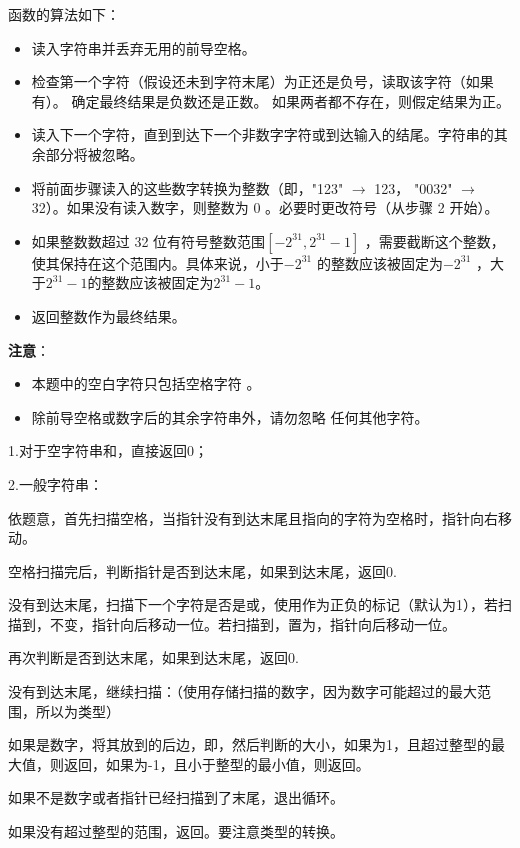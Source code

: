 \documentclass[a4paper]{report}
\begin{document}
函数的算法如下：
\begin{itemize}
\itemsep=0pt \parskip=0pt%
  \item 读入字符串并丢弃无用的前导空格。
  \item 检查第一个字符（假设还未到字符末尾）为正还是负号，读取该字符（如果有）。 确定最终结果是负数还是正数。 如果两者都不存在，则假定结果为正。
  \item 读入下一个字符，直到到达下一个非数字字符或到达输入的结尾。字符串的其余部分将被忽略。
  \item 将前面步骤读入的这些数字转换为整数（即，"123" $\rightarrow$ 123， "0032" $\rightarrow$32）。如果没有读入数字，则整数为 0 。必要时更改符号（从步骤 2 开始）。
  \item 如果整数数超过 32 位有符号整数范围$[−2^{31},  2^{31} − 1]$ ，需要截断这个整数，使其保持在这个范围内。具体来说，小于$−2^{31}$ 的整数应该被固定为$−2^{31}$ ，大于$2^{31} − 1$的整数应该被固定为$2^{31} − 1$。
\item 返回整数作为最终结果。
\end{itemize}

\textbf{注意}：
\begin{itemize}
\itemsep=0pt \parskip=0pt
\item 本题中的空白字符只包括空格字符 。
\item 除前导空格或数字后的其余字符串外，请勿忽略 任何其他字符。
\end{itemize}

\begin{tips}
1.对于空字符串和，直接返回0；

2.一般字符串：

依题意，首先扫描空格，当指针没有到达末尾且指向的字符为空格时，指针向右移动。

空格扫描完后，判断指针是否到达末尾，如果到达末尾，返回0.

没有到达末尾，扫描下一个字符是否是\dm{+}或\dm{-}，使用作为正负的标记（默认为1），若扫描到\dm{+}，不变，指针向后移动一位。若扫描到，置为，指针向后移动一位。

再次判断是否到达末尾，如果到达末尾，返回0.

没有到达末尾，继续扫描：（使用存储扫描的数字，因为数字可能超过的最大范围，所以为类型）

如果是数字，将其放到的后边，即，然后判断的大小，如果为1，且超过整型的最大值，则返回，如果为-1，且小于整型的最小值，则返回。

如果不是数字或者指针已经扫描到了末尾，退出循环。

如果没有超过整型的范围，返回。要注意类型的转换。
\end{tips}
\end{document}
